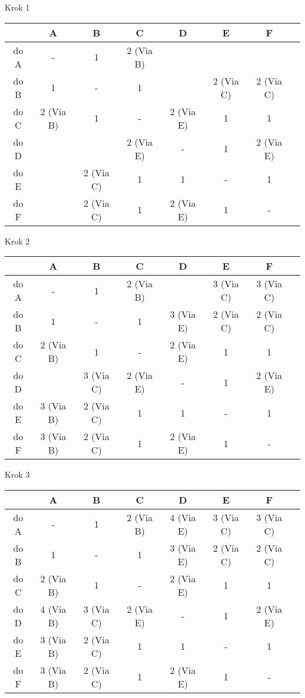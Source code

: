 \documentclass[a4paper]{article}
\begin{document}
Krok 1\\
\begin{tabular}{|c *{6}{|c} |c|}\hline
 	 & A & B & C 		 & D & E & F\\
\hline 
do A & - & 1 & 2 (Via B) & & &\\
\hline 
do B & 1 & - & 1 		 & & 2 (Via C) & 2 (Via C)\\
\hline 
do C & 2 (Via B) & 1 & - & 2 (Via E) & 1 & 1\\
\hline 
do D & & & 2 (Via E) & - & 1 & 2 (Via E)\\
\hline 
do E & & 2 (Via C) & 1 & 1 & - & 1\\
\hline
do F & & 2 (Via C) & 1 & 2 (Via E) & 1 & -\\
\hline
\end{tabular}

Krok 2\\
\begin{tabular}{|c *{6}{|c} |c|}\hline
 & A & B & C & D & E & F\\
\hline 
do A & - & 1 & 2 (Via B) &  & 3 (Via C) &  3 (Via C)\\
\hline 
do B & 1 & - & 1 & 3 (Via E) & 2 (Via C) & 2 (Via C)\\
\hline 
do C & 2 (Via B) & 1 & - & 2 (Via E) & 1 & 1\\
\hline 
do D & 			 & 3 (Via C) & 2 (Via E) & - & 1 & 2 (Via E)\\
\hline 
do E & 3 (Via B) & 2 (Via C) & 1 & 1 & - & 1\\
\hline
do F & 3 (Via B) & 2 (Via C) & 1 & 2 (Via E) & 1 & -\\
\hline
\end{tabular}

Krok 3\\
\begin{tabular}{|c *{6}{|c} |c|}\hline
 & A & B & C & D & E & F\\
\hline 
do A & - & 1 & 2 (Via B) & 4 (Via E)  & 3 (Via C) &  3 (Via C)\\
\hline 
do B & 1 & - & 1 & 3 (Via E) & 2 (Via C) & 2 (Via C)\\
\hline 
do C & 2 (Via B) & 1 & - & 2 (Via E) & 1 & 1\\
\hline 
do D & 4 (Via B) & 3 (Via C) & 2 (Via E) & - & 1 & 2 (Via E)\\
\hline 
do E & 3 (Via B) & 2 (Via C) & 1 & 1 & - & 1\\
\hline
do F & 3 (Via B) & 2 (Via C) & 1 & 2 (Via E) & 1 & -\\
\hline
\end{tabular}
\end{document}
